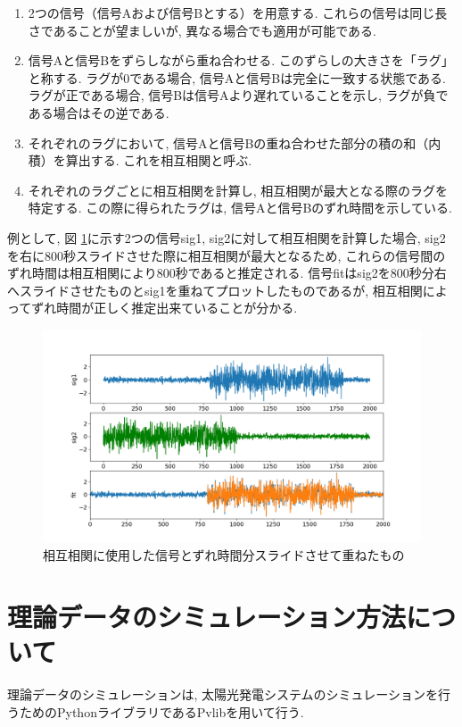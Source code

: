 \documentclass[a4j,12pt,]{jarticle}
\begin{document}
\begin{enumerate}
  \item 2つの信号（信号Aおよび信号Bとする）を用意する. これらの信号は同じ長さであることが望ましいが, 異なる場合でも適用が可能である.
  \item 信号Aと信号Bをずらしながら重ね合わせる. このずらしの大きさを「ラグ」と称する. ラグが0である場合, 信号Aと信号Bは完全に一致する状態である. ラグが正である場合, 信号Bは信号Aより遅れていることを示し, ラグが負である場合はその逆である.
  \item それぞれのラグにおいて, 信号Aと信号Bの重ね合わせた部分の積の和（内積）を算出する. これを相互相関と呼ぶ.
  \item それぞれのラグごとに相互相関を計算し, 相互相関が最大となる際のラグを特定する. この際に得られたラグは, 信号Aと信号Bのずれ時間を示している.
\end{enumerate}

例として, 図 \ref{p1}に示す2つの信号sig1, sig2に対して相互相関を計算した場合, sig2を右に800秒スライドさせた際に相互相関が最大となるため, これらの信号間のずれ時間は相互相関により800秒であると推定される. 信号fitはsig2を800秒分右へスライドさせたものとsig1を重ねてプロットしたものであるが, 相互相関によってずれ時間が正しく推定出来ていることが分かる.

\begin{figure}[H]
  \begin{center}
    \includegraphics[width=160mm]{corr_sample.png}
    \caption{相互相関に使用した信号とずれ時間分スライドさせて重ねたもの}
    \label{p1}
  \end{center}
\end{figure}

\section{理論データのシミュレーション方法について}
理論データのシミュレーションは, 太陽光発電システムのシミュレーションを行うためのPythonライブラリであるPvlibを用いて行う.
\end{document}
